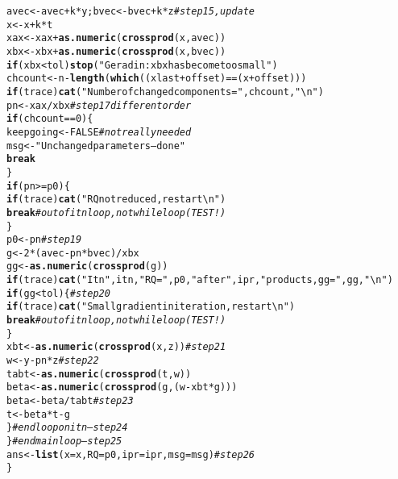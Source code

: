 \documentclass[10pt]{article}\usepackage[]{graphicx}\usepackage[]{color}
\makeatletter
\newcommand{\hlnum}[1]{\textcolor[rgb]{0.686,0.059,0.569}{#1}}%
\newcommand{\hlstr}[1]{\textcolor[rgb]{0.192,0.494,0.8}{#1}}%
\newcommand{\hlcom}[1]{\textcolor[rgb]{0.678,0.584,0.686}{\textit{#1}}}%
\newcommand{\hlopt}[1]{\textcolor[rgb]{0,0,0}{#1}}%
\newcommand{\hlstd}[1]{\textcolor[rgb]{0.345,0.345,0.345}{#1}}%
\newcommand{\hlkwa}[1]{\textcolor[rgb]{0.161,0.373,0.58}{\textbf{#1}}}%
\newcommand{\hlkwb}[1]{\textcolor[rgb]{0.69,0.353,0.396}{#1}}%
\newcommand{\hlkwc}[1]{\textcolor[rgb]{0.333,0.667,0.333}{#1}}%
\newcommand{\hlkwd}[1]{\textcolor[rgb]{0.737,0.353,0.396}{\textbf{#1}}}%
\newenvironment{kframe}{%
 \def\at@end@of@kframe{}%
 \ifinner\ifhmode%
  \def\at@end@of@kframe{\end{minipage}}%
  \begin{minipage}{\columnwidth}%
 \fi\fi%
 \def\FrameCommand##1{\hskip\@totalleftmargin \hskip-\fboxsep
 \colorbox{shadecolor}{##1}\hskip-\fboxsep
     \hskip-\linewidth \hskip-\@totalleftmargin \hskip\columnwidth}%
 \MakeFramed {\advance\hsize-\width
   \@totalleftmargin\z@ \linewidth\hsize
   \@setminipage}}%
 {\par\unskip\endMakeFramed%
 \at@end@of@kframe}
\newenvironment{knitrout}{}{} %
\makeatother
\begin{document}
\begin{knitrout}
\begin{kframe}
\begin{alltt}
       \hlstd{avec}\hlkwb{<-}\hlstd{avec}\hlopt{+}\hlstd{k}\hlopt{*}\hlstd{y; bvec}\hlkwb{<-}\hlstd{bvec}\hlopt{+}\hlstd{k}\hlopt{*}\hlstd{z} \hlcom{# step 15, update}
       \hlstd{x}\hlkwb{<-}\hlstd{x}\hlopt{+}\hlstd{k}\hlopt{*}\hlstd{t}
       \hlstd{xax}\hlkwb{<-}\hlstd{xax}\hlopt{+}\hlkwd{as.numeric}\hlstd{(}\hlkwd{crossprod}\hlstd{(x,avec))}
       \hlstd{xbx}\hlkwb{<-}\hlstd{xbx}\hlopt{+}\hlkwd{as.numeric}\hlstd{(}\hlkwd{crossprod}\hlstd{(x,bvec))}
       \hlkwa{if} \hlstd{(xbx}\hlopt{<}\hlstd{tol)} \hlkwd{stop}\hlstd{(}\hlstr{"Geradin: xbx has become too small"}\hlstd{)}
       \hlstd{chcount}\hlkwb{<-}\hlstd{n} \hlopt{-} \hlkwd{length}\hlstd{(}\hlkwd{which}\hlstd{((xlast}\hlopt{+}\hlstd{offset)}\hlopt{==}\hlstd{(x}\hlopt{+}\hlstd{offset)))}
       \hlkwa{if} \hlstd{(trace)} \hlkwd{cat}\hlstd{(}\hlstr{"Number of changed components = "}\hlstd{,chcount,}\hlstr{"\textbackslash{}n"}\hlstd{)}
       \hlstd{pn}\hlkwb{<-}\hlstd{xax}\hlopt{/}\hlstd{xbx} \hlcom{# step 17 different order}
       \hlkwa{if} \hlstd{(chcount}\hlopt{==}\hlnum{0}\hlstd{) \{}
         \hlstd{keepgoing}\hlkwb{<-}\hlnum{FALSE} \hlcom{# not really needed}
         \hlstd{msg}\hlkwb{<-}\hlstr{"Unchanged parameters -- done"}
         \hlkwa{break}
       \hlstd{\}}
       \hlkwa{if} \hlstd{(pn} \hlopt{>=} \hlstd{p0) \{}
         \hlkwa{if} \hlstd{(trace)} \hlkwd{cat}\hlstd{(}\hlstr{"RQ not reduced, restart\textbackslash{}n"}\hlstd{)}
         \hlkwa{break} \hlcom{# out of itn loop, not while loop (TEST!)}
       \hlstd{\}}
       \hlstd{p0}\hlkwb{<-}\hlstd{pn} \hlcom{# step 19}
       \hlstd{g}\hlkwb{<-}\hlnum{2}\hlopt{*}\hlstd{(avec}\hlopt{-}\hlstd{pn}\hlopt{*}\hlstd{bvec)}\hlopt{/}\hlstd{xbx}
       \hlstd{gg}\hlkwb{<-}\hlkwd{as.numeric}\hlstd{(}\hlkwd{crossprod}\hlstd{(g))}
       \hlkwa{if} \hlstd{(trace)} \hlkwd{cat}\hlstd{(}\hlstr{"Itn"}\hlstd{, itn,}\hlstr{" RQ="}\hlstd{,p0,}\hlstr{" after "}\hlstd{,ipr,}\hlstr{" products, gg="}\hlstd{,gg,}\hlstr{"\textbackslash{}n"}\hlstd{)}
       \hlkwa{if} \hlstd{(gg}\hlopt{<}\hlstd{tol)\{} \hlcom{# step 20}
         \hlkwa{if} \hlstd{(trace)} \hlkwd{cat}\hlstd{(}\hlstr{"Small gradient in iteration, restart\textbackslash{}n"}\hlstd{)}
         \hlkwa{break} \hlcom{# out of itn loop, not while loop (TEST!)}
       \hlstd{\}}
       \hlstd{xbt}\hlkwb{<-}\hlkwd{as.numeric}\hlstd{(}\hlkwd{crossprod}\hlstd{(x,z))} \hlcom{# step 21}
       \hlstd{w}\hlkwb{<-}\hlstd{y}\hlopt{-}\hlstd{pn}\hlopt{*}\hlstd{z} \hlcom{# step 22}
       \hlstd{tabt}\hlkwb{<-}\hlkwd{as.numeric}\hlstd{(}\hlkwd{crossprod}\hlstd{(t,w))}
       \hlstd{beta}\hlkwb{<-}\hlkwd{as.numeric}\hlstd{(}\hlkwd{crossprod}\hlstd{(g,(w}\hlopt{-}\hlstd{xbt}\hlopt{*}\hlstd{g)))}
       \hlstd{beta}\hlkwb{<-}\hlstd{beta}\hlopt{/}\hlstd{tabt} \hlcom{# step 23}
       \hlstd{t}\hlkwb{<-}\hlstd{beta}\hlopt{*}\hlstd{t}\hlopt{-}\hlstd{g}
    \hlstd{\}} \hlcom{# end loop on itn -- step 24}
  \hlstd{\}} \hlcom{# end main loop -- step 25}
  \hlstd{ans}\hlkwb{<-}\hlkwd{list}\hlstd{(}\hlkwc{x}\hlstd{=x,} \hlkwc{RQ}\hlstd{=p0,} \hlkwc{ipr}\hlstd{=ipr,} \hlkwc{msg}\hlstd{=msg)} \hlcom{# step 26}
\hlstd{\}}
\end{alltt}
\end{kframe}
\end{knitrout}
\end{document}

